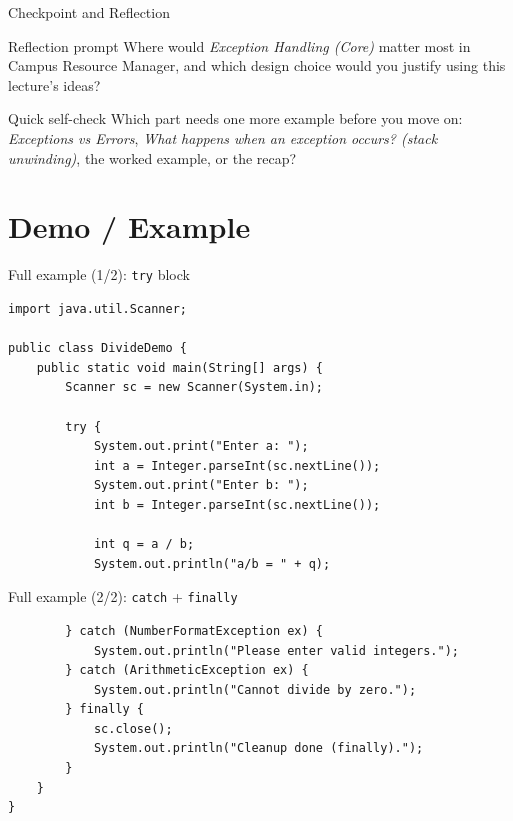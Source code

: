 \documentclass{beamer}
\begin{document}
\begin{frame}{Checkpoint and Reflection}
\begin{block}{Reflection prompt}
Where would \textit{Exception Handling (Core)} matter most in Campus Resource Manager, and which design choice would you justify using this lecture's ideas?
\end{block}
\begin{block}{Quick self-check}
Which part needs one more example before you move on: \textit{Exceptions vs Errors}, \textit{What happens when an exception occurs? (stack unwinding)}, the worked example, or the recap?
\end{block}
  \slidesources{\OOPSUnitIIISources}
\end{frame}

\section{Demo / Example}
\label{sec:demo}

\begin{frame}[fragile,shrink=8]{Full example (1/2): \texttt{try} block}
\begin{lstlisting}
import java.util.Scanner;

public class DivideDemo {
    public static void main(String[] args) {
        Scanner sc = new Scanner(System.in);

        try {
            System.out.print("Enter a: ");
            int a = Integer.parseInt(sc.nextLine());
            System.out.print("Enter b: ");
            int b = Integer.parseInt(sc.nextLine());

            int q = a / b;
            System.out.println("a/b = " + q);
\end{lstlisting}
  \slidesources{\OOPSUnitIIISources}
\end{frame}

\begin{frame}[fragile]{Full example (2/2): \texttt{catch} + \texttt{finally}}
\begin{lstlisting}
        } catch (NumberFormatException ex) {
            System.out.println("Please enter valid integers.");
        } catch (ArithmeticException ex) {
            System.out.println("Cannot divide by zero.");
        } finally {
            sc.close();
            System.out.println("Cleanup done (finally).");
        }
    }
}
\end{lstlisting}
  \slidesources{\OOPSUnitIIISources}
\end{frame}
\end{document}
